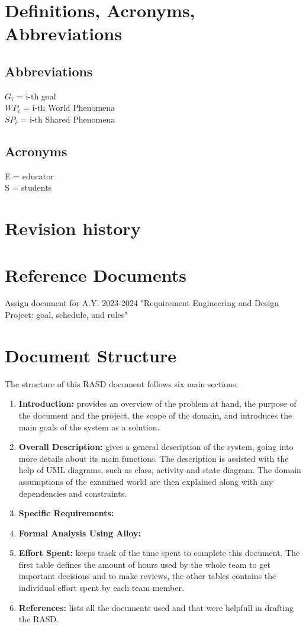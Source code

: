 \section{Definitions, Acronyms, Abbreviations}
\subsection{Abbreviations}
\(G_i\) = i-th goal \\
\(WP_i\) = i-th World Phenomena\\
\(SP_i\) = i-th Shared Phenomena\\

\subsection{Acronyms}
E = educator \\
S = students
\section{Revision history}
\section{Reference Documents}
Assign document for A.Y. 2023-2024 "Requirement Engineering and Design Project: goal, schedule, and rules"

\section{Document Structure}
The structure of this RASD document follows six main sections:
\begin{enumerate}
    \item \textbf{Introduction:}
          provides an overview of the problem at hand, the purpose of the document and
          the project, the scope of the domain, and introduces the main goals of the system as a solution.

    \item \textbf{Overall Description:}
          gives a general description of the system, going into more details about its main functions.
          The description is assisted with the help of UML diagrams, such as class, activity and state diagram.
          The domain assumptions of the examined world are then explained along with any dependencies and constraints.

    \item \textbf{Specific Requirements:}
          

    \item \textbf{Formal Analysis Using Alloy:}

    \item \textbf{Effort Spent:}
          keeps track of the time spent to complete this document.
          The first table defines the amount of hours used by the whole team to get important decisions and to make reviews,
          the other tables contains the individual effort spent by each team member.

    \item \textbf{References:}
          lists all the documents used and that were helpfull in drafting the RASD.
\end{enumerate}
